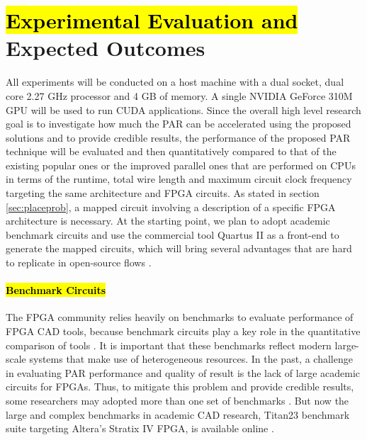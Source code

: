 \documentclass[a4paper,oneside,12pt]{article}
\begin{document}




\section{\hl{Experimental Evaluation and} Expected Outcomes}

All experiments will be conducted on a host machine with a dual socket, dual core 2.27 GHz processor and 4 GB of memory. A single NVIDIA GeForce 310M GPU will be used to run CUDA applications.
Since the overall high level research goal is to investigate how much the PAR can be accelerated using the proposed solutions and to provide credible results, the performance of the proposed PAR technique will be evaluated and then quantitatively compared to that of the existing popular ones or the improved parallel ones that are performed on CPUs in terms of the runtime, total wire length and maximum circuit clock frequency targeting the same architecture and FPGA circuits. As stated in section \ref{sec:placeprob}, a mapped circuit involving a description of a specific FPGA architecture is necessary. At the starting point, we plan to adopt academic benchmark circuits and use the commercial tool Quartus II as a front-end to generate the mapped circuits, which will bring several advantages that are hard to replicate in open-source flows \cite{murray2015timing}.

\paragraph{\hl{Benchmark Circuits}}
The FPGA community relies heavily on benchmarks to evaluate performance of FPGA CAD tools, because benchmark circuits play a key role in the quantitative comparison of tools \cite{murray2015timing}. It is important that these benchmarks reflect modern large-scale systems that make use of heterogeneous resources.
In the past, a challenge in evaluating PAR performance and quality of result is the lack of large academic circuits for FPGAs. Thus, to mitigate this problem and provide credible results, some researchers may adopted more than one set of benchmarks \cite{bian2010towards}. But now the large and complex benchmarks in academic CAD research, Titan23 benchmark suite targeting Altera's Stratix IV FPGA, is available online \cite{Titan23}.
\end{document}
